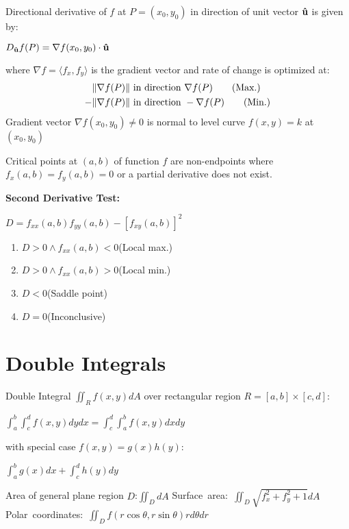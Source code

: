 \documentclass[12pt, a4paper]{article}
\begin{document}
\begin{multicols*}{4}
Directional derivative of $f$ at $P = (x_0,y_0)$ in direction of unit vector $\mathbf{\hat{u}}$ is given by:\\
{\centering
  $D_{\mathbf{\hat{u}}}f(P) = \nabla f(x_0,y_0)\cdot \mathbf{\hat{u}}$
\par}
\vspace{-0.5em}
where $\nabla f = \langle f_x, f_y \rangle$ is the gradient vector
\vspace{-0.5em}
and rate of change is optimized at:
\vspace{-0.5em}
\begin{align*}
  \lVert\nabla f(P)\rVert&\text{ in direction }\nabla f(P)\tag*{(Max.)}\\
  -\lVert\nabla f(P)\rVert&\text{ in direction }-\nabla f(P)\tag*{(Min.)}
\end{align*}
Gradient vector $\nabla f(x_0, y_0) \neq 0$ is normal to level curve $f(x,y)=k$ at $(x_0, y_0)$

Critical points at $(a,b)$ of function $f$ are non-endpoints where $f_x(a,b)=f_y(a,b)=0$ or a partial derivative does not exist.

\textbf{Second Derivative Test:}\\
{\centering
  $D = f_{xx}(a,b)f_{yy}(a,b)-[f_{xy}(a,b)]^2$
\par}
\begin{enumerate}[\roman*.]
  \item $D>0 \land f_{xx}(a,b)<0$\hfill(Local max.)
  \item $D>0 \land f_{xx}(a,b)>0$\hfill(Local min.)
  \item $D<0$\hfill(Saddle point)
  \item $D=0$\hfill(Inconclusive)
\end{enumerate}

\section{Double Integrals}
Double Integral $\iint_R f(x,y)dA$ over rectangular region $R = [a,b]\times[c,d]$:\\
{\centering
  $\displaystyle\int^b_a\int^d_c f(x,y)dydx = \int^d_c\int^b_af(x,y)dxdy$
\par}
\vspace{-0.5em}
with special case $f(x,y) = g(x)h(y)$:\\
{\centering
  $\displaystyle\int^b_a g(x)dx + \int^d_ch(y)dy$
\par}

Area of general plane region $D$:$\displaystyle\iint_D dA$
\mbox{Surface area: $\displaystyle \iint_D\sqrt{f_x^2+f_y^2+1}dA$}
\mbox{Polar coordinates: $\displaystyle \iint_Df(r\cos\theta,r\sin\theta)r d\theta dr$}


\end{multicols*}
\end{document}
